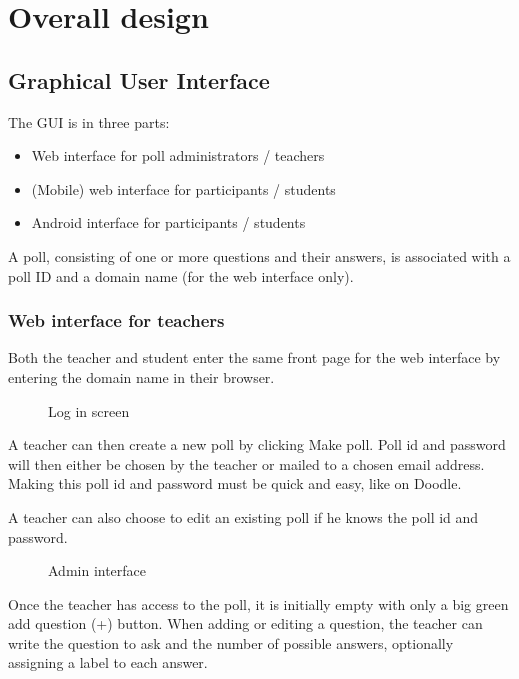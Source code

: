 \documentclass{acm_proc_article-sp}
\begin{document}
\section{Overall design}

\subsection{Graphical User Interface}
The GUI is in three parts:
\begin{itemize}
  \item Web interface for poll administrators / teachers
  \item (Mobile) web interface for participants / students
  \item Android interface for participants / students
\end{itemize}

A poll, consisting of one or more questions and their answers, is associated with a poll ID and a domain name (for the web interface only).

\subsubsection{Web interface for teachers}
Both the teacher and student enter the same front page for the web interface by entering the domain name in their browser.

\begin{figure}[h]
\centering
{}
\caption{Log in screen}
\label{fig:teacher_interface}
\end{figure}

A teacher can then create a new poll by clicking Make poll. Poll id and password will then either be chosen by the teacher or mailed to a chosen email address. Making this poll id and password must be quick and easy, like on Doodle.

A teacher can also choose to edit an existing poll if he knows the poll id and password.

\begin{figure}[h]
\centering
{}
\caption{Admin interface}
\label{fig:polls}
\end{figure}

Once the teacher has access to the poll, it is initially empty with only a big green add question (+) button. When adding or editing a question, the teacher can write the question to ask and the number of possible answers, optionally assigning a label to each answer.
\end{document}

